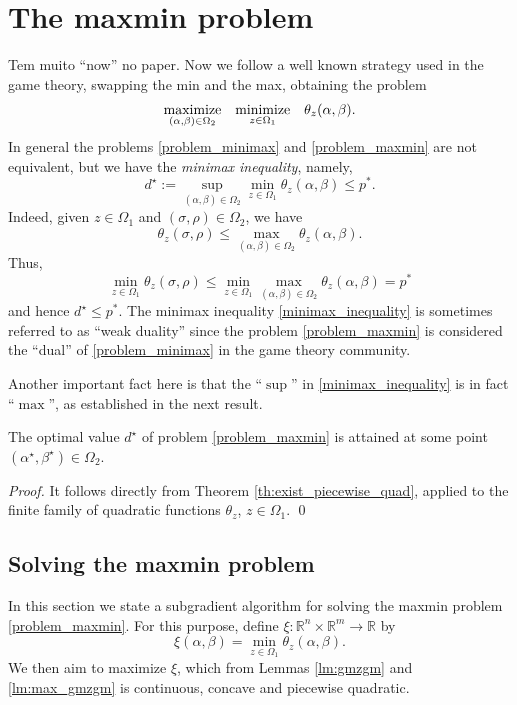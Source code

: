 \documentclass[smallextended,referee,envcountsect]{svjour3}
\newcommand{\R}{\mathbb{R}}
\newcommand{\Ademir}[1]{{\color{Ademir} #1}} %
\newcommand{\rmv}[1]{{\color{red} #1}} %
\begin{document}
\section{\Ademir{The maxmin problem}}
\label{sec:maxmin_problem}
\rmv{Tem muito ``now'' no paper.}
Now we follow a well known strategy used in the game theory, swapping the min and the 
max, obtaining the problem 
\begin{equation}
\label{problem_maxmin}
\begin{array}{ccl}
\displaystyle\mathop{\rm maximize}_{(\alpha,\beta)\in\Omega_2} & 
\displaystyle\mathop{\rm minimize}_{z\in\Omega_1} & 
\theta_z(\alpha,\beta).
\end{array}
\end{equation}
In general the problems \eqref{problem_minimax} and \eqref{problem_maxmin} are not 
equivalent, but we have the {\em minimax inequality}, namely, 
\begin{equation}
\label{minimax_inequality}
d^\star:=\sup_{(\alpha,\beta)\in\Omega_2}
\min_{z\in\Omega_1}
\theta_z(\alpha,\beta)\leq p^*.
\end{equation}
Indeed, given $z\in\Omega_1$ and $(\sigma,\rho)\in\Omega_2$, we have 
$$
\theta_z(\sigma,\rho)\leq 
\max_{(\alpha,\beta)\in\Omega_2}
\theta_z(\alpha,\beta).
$$
Thus, 
$$
\min_{z\in\Omega_1}
\theta_z(\sigma,\rho)\leq 
\min_{z\in\Omega_1}
\max_{(\alpha,\beta)\in\Omega_2}
\theta_z(\alpha,\beta) = p^*
$$
and hence $d^\star\leq{p^*}$. The minimax inequality \eqref{minimax_inequality} is 
sometimes referred to as ``weak duality'' since the problem \eqref{problem_maxmin} is 
considered the ``dual'' of \eqref{problem_minimax} in the game theory community. 

Another important fact here is that the ``$\sup$'' in \eqref{minimax_inequality} is in 
fact ``$\max$'', as established in the next result.

\begin{lemma}
\label{lm:exist_inner_dual}
The optimal value $d^\star$ of problem  \eqref{problem_maxmin} is attained at some 
point $(\alpha^\star,\beta^\star)\in\Omega_2$.
\end{lemma}
\begin{proof}
It follows directly from Theorem \ref{th:exist_piecewise_quad}, applied to the 
finite family of quadratic functions $\theta_z$, $z\in\Omega_1$.
\qed\end{proof}


\subsection{Solving the maxmin problem}
\label{sec:alg_maxmin}
In this section we state a subgradient 
algorithm \cite{BertsekasNedicOzdaglar03,Nesterov04} for solving the 
maxmin problem \eqref{problem_maxmin}. For this purpose, define 
$\xi:\R^n\times\R^m\to\R$ by 
\begin{equation}
\label{function:xi}
\xi(\alpha,\beta) = \min_{z\in\Omega_1}\theta_z(\alpha,\beta).
\end{equation}
We then aim to maximize $\xi$, which from Lemmas \ref{lm:gmzgm} and 
\ref{lm:max_gmzgm} is continuous, concave and piecewise quadratic.
\end{document}
